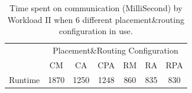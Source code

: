 \documentclass[conference,compsoc]{IEEEtran}
\newcommand{\NOTE}[1]{\hl {NOTE: #1}}
\begin{document}
% 
% 
% 
% 
%  

\begin{table}[ht]
\begin{center}
\caption{Time spent on communication (MilliSecond) by Workload II when 6 different placement\&routing configuration in use.} 
\label{tab:wkld-commtime}
\begin{tabular}{l c c c c c c }
\toprule %
\toprule
&\multicolumn{6}{c}{Placement\&Routing Configuration} \\ %
\cmidrule(l){2-7}
	 & CM & CA & CPA & RM & RA & RPA \\ %
\midrule %
Runtime  &  1870 & 1250 & 1248 & 860 & 835 &830\\ %

\midrule %
\bottomrule %
\end{tabular}
\end{center}
\end{table}
\end{document}
